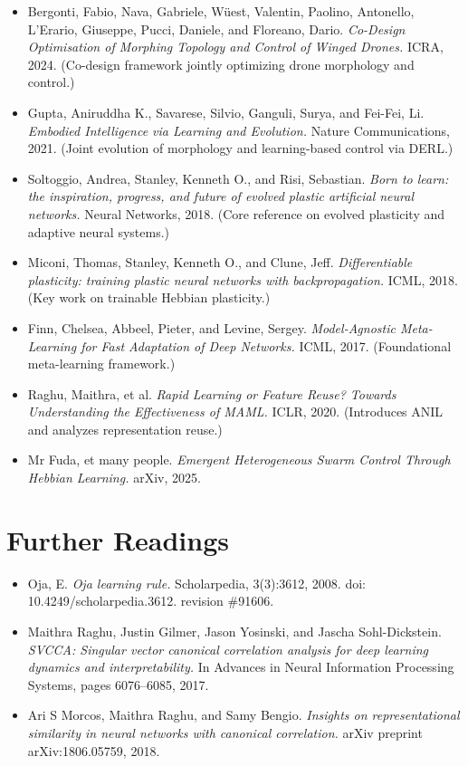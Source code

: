 \documentclass[letterpaper,10pt]{article}
\begin{document}
\begin{itemize}

\item Bergonti, Fabio, Nava, Gabriele, Wüest, Valentin, Paolino, Antonello, L’Erario, Giuseppe, Pucci, Daniele, and Floreano, Dario.
\textit{Co-Design Optimisation of Morphing Topology and Control of Winged Drones.}
ICRA, 2024.  
(Co-design framework jointly optimizing drone morphology and control.)

\item Gupta, Aniruddha K., Savarese, Silvio, Ganguli, Surya, and Fei-Fei, Li.
\textit{Embodied Intelligence via Learning and Evolution.}
Nature Communications, 2021.  
(Joint evolution of morphology and learning-based control via DERL.)

\item Soltoggio, Andrea, Stanley, Kenneth O., and Risi, Sebastian. 
\textit{Born to learn: the inspiration, progress, and future of evolved plastic artificial neural networks.}
Neural Networks, 2018.  
(Core reference on evolved plasticity and adaptive neural systems.)

\item Miconi, Thomas, Stanley, Kenneth O., and Clune, Jeff. 
\textit{Differentiable plasticity: training plastic neural networks with backpropagation.}
ICML, 2018.  
(Key work on trainable Hebbian plasticity.)

\item Finn, Chelsea, Abbeel, Pieter, and Levine, Sergey. 
\textit{Model-Agnostic Meta-Learning for Fast Adaptation of Deep Networks.}
ICML, 2017.  
(Foundational meta-learning framework.)

\item Raghu, Maithra, et al. 
\textit{Rapid Learning or Feature Reuse? Towards Understanding the Effectiveness of MAML.}
ICLR, 2020.  
(Introduces ANIL and analyzes representation reuse.)

\item Mr Fuda, et many people.
\textit{Emergent Heterogeneous Swarm Control Through
Hebbian Learning.}
arXiv, 2025.


\end{itemize}

\section{Further Readings}
\begin{itemize}
    \item Oja, E. \textit{Oja learning rule.} Scholarpedia, 3(3):3612, 2008. doi: 10.4249/scholarpedia.3612. revision \#91606.
    \item Maithra Raghu, Justin Gilmer, Jason Yosinski, and Jascha Sohl-Dickstein. \textit{SVCCA: Singular vector canonical correlation analysis for deep learning dynamics and interpretability.} In Advances in Neural Information Processing Systems, pages 6076–6085, 2017.
    \item Ari S Morcos, Maithra Raghu, and Samy Bengio. \textit{Insights on representational similarity in neural networks with canonical correlation.} arXiv preprint arXiv:1806.05759, 2018.
\end{itemize}
\end{document}
